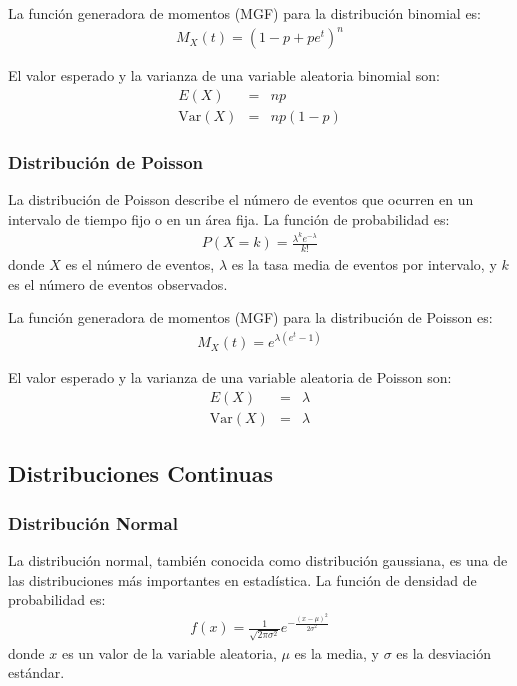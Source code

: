 \documentclass[a4paper]{report} %
\begin{document}
La funci\'on generadora de momentos (MGF) para la distribuci\'on binomial es:
\begin{eqnarray*}
M_X(t) = \left( 1 - p + pe^t \right)^n
\end{eqnarray*}

El valor esperado y la varianza de una variable aleatoria binomial son:
\begin{eqnarray*}
E(X) &=& np \\
\text{Var}(X) &=& np(1-p)
\end{eqnarray*}
\subsubsection{Distribuci\'on de Poisson}
La distribuci\'on de Poisson describe el n\'umero de eventos que ocurren en un intervalo de tiempo fijo o en un \'area fija. La funci\'on de probabilidad es:
\begin{eqnarray*}
P(X = k) = \frac{\lambda^k e^{-\lambda}}{k!}
\end{eqnarray*}
donde $X$ es el n\'umero de eventos, $\lambda$ es la tasa media de eventos por intervalo, y $k$ es el n\'umero de eventos observados.

La funci\'on generadora de momentos (MGF) para la distribuci\'on de Poisson es:
\begin{eqnarray*}
M_X(t) = e^{\lambda (e^t - 1)}
\end{eqnarray*}

El valor esperado y la varianza de una variable aleatoria de Poisson son:
\begin{eqnarray*}
E(X) &=& \lambda \\
\text{Var}(X) &=& \lambda
\end{eqnarray*}
\subsection{Distribuciones Continuas}
\subsubsection{Distribuci\'on Normal}
La distribuci\'on normal, tambi\'en conocida como distribuci\'on gaussiana, es una de las distribuciones m\'as importantes en estad\'istica. La funci\'on de densidad de probabilidad es:
\begin{eqnarray*}
f(x) = \frac{1}{\sqrt{2\pi\sigma^2}} e^{-\frac{(x-\mu)^2}{2\sigma^2}}
\end{eqnarray*}
donde $x$ es un valor de la variable aleatoria, $\mu$ es la media, y $\sigma$ es la desviaci\'on est\'andar.
\end{document}
